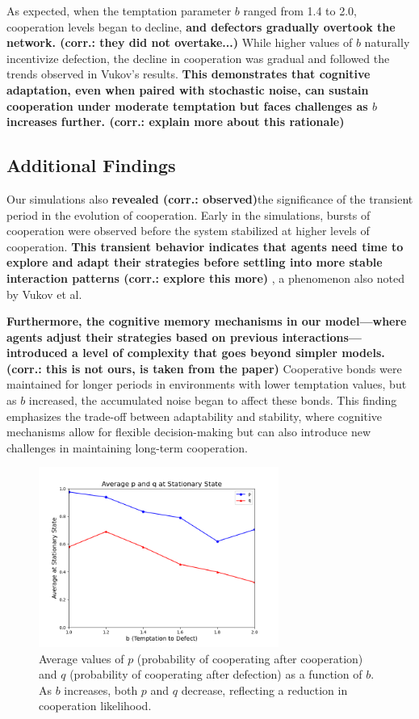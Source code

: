 \documentclass[runningheads]{llncs}
\begin{document}
As expected, when the temptation parameter \( b \) ranged from 1.4 to 2.0, cooperation levels began to decline, \textbf{and defectors gradually overtook the network. (corr.: they did not overtake...)} While higher values of \( b \) naturally incentivize defection, the decline in cooperation was gradual and followed the trends observed in Vukov's results. \textbf{This demonstrates that cognitive adaptation, even when paired with stochastic noise, can sustain cooperation under moderate temptation but faces challenges as \( b \) increases further. (corr.: explain more about this rationale)}

\subsection{Additional Findings}
Our simulations also \textbf{revealed (corr.: observed)}the significance of the transient period in the evolution of cooperation. Early in the simulations, bursts of cooperation were observed before the system stabilized at higher levels of cooperation. \textbf{This transient behavior indicates that agents need time to explore and adapt their strategies before settling into more stable interaction patterns (corr.: explore this more)} , a phenomenon also noted by Vukov et al.

\textbf{Furthermore, the cognitive memory mechanisms in our model—where agents adjust their strategies based on previous interactions—introduced a level of complexity that goes beyond simpler models. (corr.: this is not ours, is taken from the paper)}  Cooperative bonds were maintained for longer periods in environments with lower temptation values, but as \( b \) increased, the accumulated noise began to affect these bonds. This finding emphasizes the trade-off between adaptability and stability, where cognitive mechanisms allow for flexible decision-making but can also introduce new challenges in maintaining long-term cooperation.

\begin{figure}[htbp]
    \centering
    \includegraphics[width=0.7\textwidth]{p_q_vs_b.png}
    \caption{Average values of \( p \) (probability of cooperating after cooperation) and \( q \) (probability of cooperating after defection) as a function of \( b \). As \( b \) increases, both \( p \) and \( q \) decrease, reflecting a reduction in cooperation likelihood.}
    \label{fig:p_q_vs_b}
\end{figure}
\end{document}
